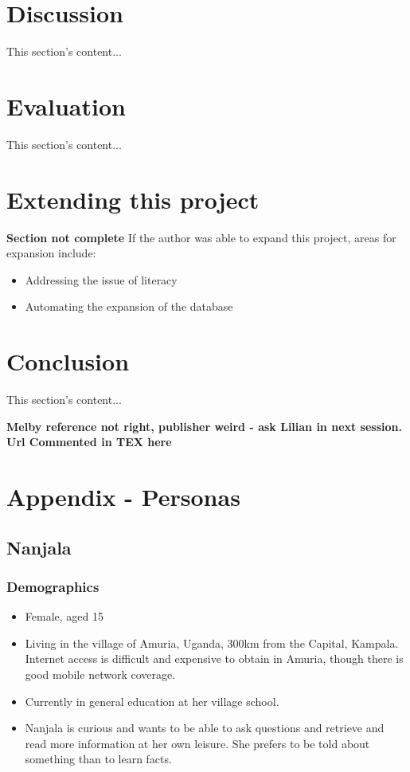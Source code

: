 \documentclass{article}
\begin{document}
\newpage
\section{Discussion}
\label{sec:discussion}
This section's content...

\newpage

\newpage
\section{Evaluation}
\label{sec:evaluation}
This section's content...

\newpage

\section{Extending this project}
\label{sec:extending}
{\bf Section not complete} %
If the author was able to expand this project, areas for expansion include:
\begin{itemize}
  \item Addressing the issue of literacy
  \item Automating the expansion of the database
\end{itemize}

\newpage

\section{Conclusion}
\label{sec:conclusion}
This section's content...

\newpage

{\bf Melby reference not right, publisher weird - ask Lilian in next session.  Url Commented in TEX here} 



\newpage
\section{Appendix - Personas}
\label{sec:appendixPersonas}
\subsection{Nanjala}
\subsubsection{Demographics}
\begin{itemize}
  \item Female, aged 15
  \item Living in the village of Amuria, Uganda, 300km from the Capital, Kampala.  Internet access is difficult and expensive to obtain in Amuria, though there is good mobile network coverage.
  \item Currently in general education at her village school.
  \item Nanjala is curious and wants to be able to ask questions and retrieve and read more information at her own leisure.  She prefers to be told about something than to learn facts.
\end{itemize}
\end{document}
